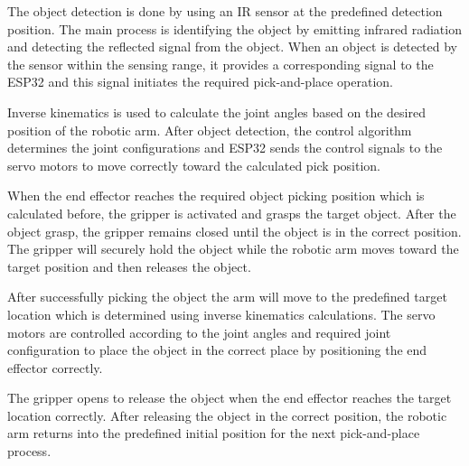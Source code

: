 The object detection is done by using an IR sensor at the predefined detection position. The main process is identifying the object by emitting infrared radiation and detecting the reflected signal from the object. When an object is detected by the sensor within the sensing range, it provides a corresponding signal to the ESP32 and this signal initiates the required pick-and-place operation. 

Inverse kinematics is used to calculate the joint angles based on the desired position of the robotic arm. After object detection, the control algorithm determines the joint configurations and ESP32 sends the control signals to the servo motors to move correctly toward the calculated pick position. 

When the end effector reaches the required object picking position which is calculated before, the gripper is activated and grasps the target object. After the object grasp, the gripper remains closed until the object is in the correct position. The gripper will securely hold the object while the robotic arm moves toward the target position and then releases the object.

After successfully picking the object the arm will move to the predefined target location which is determined using inverse kinematics calculations. The servo motors are controlled according to the joint angles and required joint configuration to place the object in the correct place by positioning the end effector correctly. 

The gripper opens to release the object when the end effector reaches the target location correctly. After releasing the object in the correct position, the robotic arm returns into the predefined initial position for the next pick-and-place process. 
